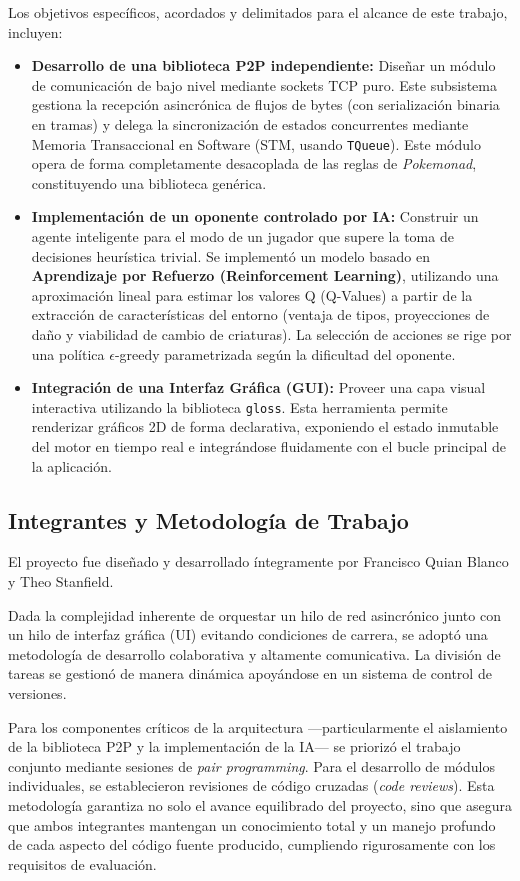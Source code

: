 Los objetivos específicos, acordados y delimitados para el alcance de este trabajo, incluyen:
\begin{itemize}
    \item \textbf{Desarrollo de una biblioteca P2P independiente:} Diseñar un módulo de comunicación de bajo nivel mediante sockets TCP puro. Este subsistema gestiona la recepción asincrónica de flujos de bytes (con serialización binaria en tramas) y delega la sincronización de estados concurrentes mediante Memoria Transaccional en Software (STM, usando \texttt{TQueue}). Este módulo opera de forma completamente desacoplada de las reglas de \textit{Pokemonad}, constituyendo una biblioteca genérica.
    \item \textbf{Implementación de un oponente controlado por IA:} Construir un agente inteligente para el modo de un jugador que supere la toma de decisiones heurística trivial. Se implementó un modelo basado en \textbf{Aprendizaje por Refuerzo (Reinforcement Learning)}, utilizando una aproximación lineal para estimar los valores Q (Q-Values) a partir de la extracción de características del entorno (ventaja de tipos, proyecciones de daño y viabilidad de cambio de criaturas). La selección de acciones se rige por una política $\epsilon$-greedy parametrizada según la dificultad del oponente.
    \item \textbf{Integración de una Interfaz Gráfica (GUI):} Proveer una capa visual interactiva utilizando la biblioteca \texttt{gloss}. Esta herramienta permite renderizar gráficos 2D de forma declarativa, exponiendo el estado inmutable del motor en tiempo real e integrándose fluidamente con el bucle principal de la aplicación.
\end{itemize}

\subsection{Integrantes y Metodología de Trabajo}
El proyecto fue diseñado y desarrollado íntegramente por Francisco Quian Blanco y Theo Stanfield. 

Dada la complejidad inherente de orquestar un hilo de red asincrónico junto con un hilo de interfaz gráfica (UI) evitando condiciones de carrera, se adoptó una metodología de desarrollo colaborativa y altamente comunicativa. La división de tareas se gestionó de manera dinámica apoyándose en un sistema de control de versiones. 

Para los componentes críticos de la arquitectura —particularmente el aislamiento de la biblioteca P2P y la implementación de la IA— se priorizó el trabajo conjunto mediante sesiones de \textit{pair programming}. Para el desarrollo de módulos individuales, se establecieron revisiones de código cruzadas (\textit{code reviews}). Esta metodología garantiza no solo el avance equilibrado del proyecto, sino que asegura que ambos integrantes mantengan un conocimiento total y un manejo profundo de cada aspecto del código fuente producido, cumpliendo rigurosamente con los requisitos de evaluación.

\clearpage